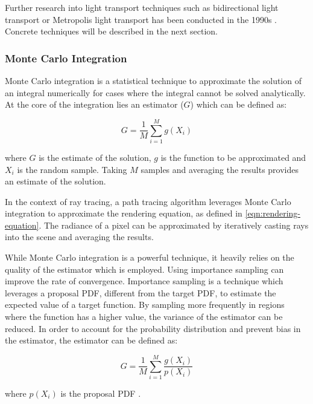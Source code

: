 Further research into light transport techniques such as bidirectional light transport or Metropolis light transport has been conducted in the 1990s \cite{veachMonteCarloLightTransport}. Concrete techniques will be described in the next section.

\subsubsection{Monte Carlo Integration}

Monte Carlo integration is a statistical technique to approximate the solution of an integral numerically for cases where the integral cannot be solved analytically. At the core of the integration lies an estimator ($G$) which can be defined as:

\begin{equation}
  G = \frac{1}{M}\sum_{i=1}^M g(X_i)
  \label{eq:monteCarlo}
\end{equation}

where $G$ is the estimate of the solution, $g$ is the function to be approximated and $X_i$ is the random sample. Taking $M$ samples and averaging the results provides an estimate of the solution. \cite{kalos2009monte}

In the context of ray tracing, a path tracing algorithm leverages Monte Carlo integration to approximate the rendering equation, as defined in \autoref{eqn:rendering-equation}. The radiance of a pixel can be approximated by iteratively casting rays into the scene and averaging the results. 

While Monte Carlo integration is a powerful technique, it heavily relies on the quality of the estimator which is employed. Using importance sampling can improve the rate of convergence. Importance sampling is a technique which leverages a proposal \gls{PDF}, different from the target \gls{PDF}, to estimate the expected value of a target function. By sampling more frequently in regions where the function has a higher value, the variance of the estimator can be reduced. In order to account for the probability distribution and prevent bias in the estimator, the estimator can be defined as:

\begin{equation}
  G = \frac{1}{M}\sum_{i=1}^M \frac{g(X_i)}{p(X_i)}
  \label{eq:importanceSampling}
\end{equation}

where $p(X_i)$ is the proposal \gls{PDF} \cite{Pharr_Physically_Based_Rendering_2023}.

